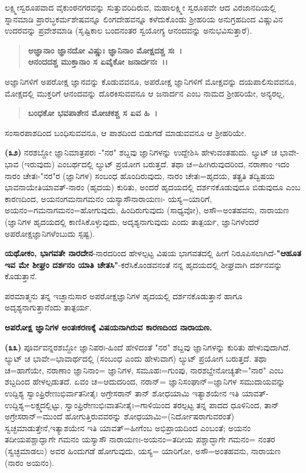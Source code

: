 
ಲಕ್ಷ್ಮೀಸ್ವರೂಪವಾದ ವೈಕುಂಠನಗರವನ್ನು ಸುತ್ತುವರಿದಿರುವ, ಮಹಾಲಕ್ಷ್ಮೀ ಸ್ವರೂಪವೇ ಆದ ವಿರಜಾನದಿಯಲ್ಲಿ ಸ್ನಾನಮಾಡಿ ಪ್ರಾರಬ್ಧಕರ್ಮಶೇಷವನ್ನೂ ಲಿಂಗದೇಹವನ್ನೂ ಕಳೆದುಕೊಂಡು ಶ‍್ರೀಹರಿಯ ಅನುಗ್ರಹದಿಂದ ವಿಷ್ಣುವಿನ ಉದರವನ್ನು ಪ್ರವೇಶಮಾಡಿ (ಸೃಷ್ಟಿಕಾಲ ಬಂದನಂತರ ಸ್ವಯೋಗ್ಯ ಆನಂದವನ್ನು ಅನುಭವಿಸುತ್ತಾರೆ).

\newpage

\begin{verse}
\textbf{ಅಜ್ಞಾನಾಂ ಜ್ಞಾನದೋ ವಿಷ್ಣುಃ ಜ್ಞಾನಿನಾಂ ಮೋಕ್ಷದಶ್ಚ ಸಃ~।}\\\textbf{ಆನಂದದಶ್ಚ ಮುಕ್ತಾನಾಂ ಸ ಏವೈಕೋ ಜನಾರ್ದನಃ~।।}
\end{verse}


ಅಜ್ಞಾನಿಗಳಿಗೆ ಅಪರೋಕ್ಷ ಜ್ಞಾನವನ್ನು ಕೊಡುವವನೂ, ಅಪರೋಕ್ಷ ಜ್ಞಾನಿಗಳಿಗೆ ಮೋಕ್ಷವನ್ನು ದಯಪಾಲಿಸುವವನೂ, ಮೋಕ್ಷದಲ್ಲಿ ಮುಕ್ತರಿಗೆ ಆನಂದವನ್ನು ದೊರಕಿಸುವವನೂ ಆ ಜನಾರ್ದನ ಎಂಬ ನಾಮದ ಶ‍್ರೀಹರಿಯೇ, ಅನ್ಯರಲ್ಲ,

\begin{verse}
\textbf{ಬಂಧಕೋ ಭವಪಾಶೇನ ಮೋಚಕಶ್ಚ ಸ ಏವ ಹಿ~।}
\end{verse}


ಸಂಸಾರಪಾಶದಿಂದ ಬಂಧಿಸುವವನೂ, ಆ ಪಾಶದಿಂದ ಬಿಡುಗಡೆ ಮಾಡುವವನೂ ಆ ಶ‍್ರೀಹರಿಯೇ.

\textbf{(೩೨)} ನರಶಬ್ದೋ ಜ್ಞಾನಿಮಾತ್ರಪರಃ -"ನರ" ಶಬ್ದವು ಜ್ಞಾನಿಗಳನ್ನು ಉದ್ದೇಶಿಸಿ ಹೇಳು\-ವಂತಹುದು. ಲ್ಯುಟ್ ಚ ಭಾವೇ-ಭಾವ (ಇರುವುದು) ಎಂಬರ್ಥದಲ್ಲಿ ಲ್ಯುಟ್ ಪ್ರಯೋಗ ಬರುತ್ತದೆ. ತಥಾ ಚ=ಹೀಗಿರುವುದರಿಂದ, ನರಾಣಾಂ ಇದಂ ನಾರಂ ಚೇತಃ-"ನರ"ರ (ಜ್ಞಾನಿಗಳ) ಸಂಬಂಧ ಹೊಂದಿರುವುದು, ನಾರಂ ಚೇತಃ=ಹೃದಯ, ತತ್ಪ್ರತಿ ತದ್ವಿಷಯ ಭಾವನಾಯೇತಿಯಾವತ್-ನಾರಂ (ಹೃದಯ) ಕುರಿತು, ಅಂದರೆ ಹೃದಯದಲ್ಲಿ ದರ್ಶನಕೊಡುವುದೂ ಬಿಡುವುದೂ ಎಂಬ ಕಾರಣದಿಂದ, ಅಯನಂಗಮನಾಗಮನಂ ಯಸ್ಯಾಸೌ\break ನಾರಾಯಣಃ- ಯಸ್ಯ=ಯಾರಿಗೆ, ಅಯನಂ=ಗಮನಾಗಮನಂ=ಹೋಗುವುದು, ಹಿಂದಿರು\-ಗುವುದು (ಸಾಧ್ಯವೋ), ಅಸೌ=ಅಂತಹವನು, ನಾರಾಯಣ (ಜ್ಞಾನಿಗಳ ಹೃದಯದಲ್ಲಿ ಕಾಣಿಸಿ\-ಕೊಳ್ಳುವುದು, ಅದೃಶ್ಯನಾಗುವುದು ಎಂದು ತಾತ್ಪರ್ಯ, ಜ್ಞಾನಿಗಳೆಂದರೆ ಅಪರೋಕ್ಷ\-ಜ್ಞಾನಿಗಳೆಂಬುದು ಸ್ಪಷ್ಟ).

\textbf{ಯಥೋಕಂ, ಭಾಗವತೇ ನಾರದೇನ}-ನಾರದರಿಂದ ಹೇಳಲ್ಪಟ್ಟ ವಿಷಯ ಭಾಗವತದಲ್ಲಿ ಹೀಗೆ ನಿರೂಪಿಸಲಾಗಿದೆ-\textbf{"ಆಹೂತ ಇವ ಮೇ ಶೀಘ್ರಂ ದರ್ಶನಂ ಯಾತಿ ಚೇತಸಿ"}\break -ಕರೆಸಿಕೊಂಡವನಂತೆ ನನ್ನ ಹೃದಯದಲ್ಲಿ ಶೀಘ್ರವಾಗಿ ದರ್ಶನವನ್ನು ಕೊಡುತ್ತಾನೆ.

ಪರಮಾತ್ಮನು ತನ್ನ ಇಚ್ಛಾನುಸಾರ ಅಪರೋಕ್ಷಜ್ಞಾನಿಗಳ ಹೃದಯಲ್ಲಿ ದರ್ಶನಕೊಡುತ್ತಾನೆ ಹಾಗೂ ಅದೃಶ್ಯನಾಗುತ್ತಾನೆಂದು ತಾತ್ಪರ್ಯ.

\begin{center}
\textbf{ಅಪರೋಕ್ಷ ಜ್ಞಾನಿಗಳ ಅಂತಃಕರಣಕ್ಕೆ ವಿಷಯನಾಗಿರುವ ಕಾರಣದಿಂದ ನಾರಾಯಣ.}
\end{center}

\textbf{(೩೩)} ಪೂರ್ವವನ್ನರಶಬ್ದೋ ಜ್ಞಾನಿಪರಃ-ಹಿಂದೆ ಹೇಳಿದಂತೆ "ನರ" ಶಬ್ದವು ಜ್ಞಾನಿಗಳನ್ನು ಕುರಿತು ಹೇಳುವುದಾಗಿದೆ. ಲ್ಯುಟ್ ಚ ಭಾವೇ=ಭಾವಾರ್ಥದಲ್ಲಿ (ಸಂಬಂಧ ಎಂದು ಹೇಳುವಾಗ) ಲ್ಯುಟ್ ಪ್ರಯೋಗ ಬರುತ್ತದೆ. ತಥಾ ಚ=ಹಾಗೆಯೇ, ನರಾಣಾಂ ಜ್ಞಾನಿನಾಂ= ಜ್ಞಾನಿಗಳ, ಸಮೂಹಃ=ಗುಂಪು, ನಾರಶಬ್ದೇನೋಚ್ಯತೇ="ನಾರ" ಎಂಬ ಶಬ್ದದಿಂದ ಹೇಳಲ್ಪಡುತದೆ. ಏವಂ ಚ=ಆದುದರಿಂದ, ನರಾನ್= ಜ್ಞಾನಿಸಂಘಾನ್=ಜ್ಞಾನಿಗಳ ಸಮುದಾಯವನ್ನು ಉದ್ದಿಶ್ಯ ಸ್ವಾಂಫ್ರಿರೇಣುಭಿರ್ವಾತನೀತೈಃ ಅಗ್ರೇಸರಾನ್ ತಾನ್ ಶೋಧ\-ಯಾಮಿ ಇತ್ಯಾಶಯೇನ ಇತಿ ಯಾವತ್‌-ಉದ್ದಿಶ್ಯ=ಲಕ್ಷ್ಮದಲ್ಲಿಟ್ಟು, ಸ್ವಾಂಫ್ರಿರೇಣುಭಿಃವಾತನೀತೈಃ=ಗಾಳಿಯಿಂದ ತರಲ್ಪಟ್ಟ ತನ್ನ ಪಾದದ ಧೂಳಿನಿಂದ, ತಾನ್ ಅಗ್ರೇಸರಾನ್=ಮುಂದೆ ಹೋಗುತ್ತಿರುವವರನ್ನು ಶೋಧಯಾಮಿ=(ನಿರ್ದೋಷರಾಗುವರಂತೆ) ಸ್ವಚ್ಛಮಾಡುತ್ತೇನೆ,\break ಇತ್ಯಾಶಯೇನ ಇತಿ ಯಾವತ್=ಹೀಗೆಂಬ ಅಭಿಪ್ರಾಯದಿಂದ ಎಂಬಂತೆ; ಅಯನಂ ತದೀಯಪಶ್ಚಾದ್ಘಾಗೇ ಗಮನಂ ಯಸ್ಯಾಸೌ ನಾರಾಯಣಃ-ಅಯನಂ=ತದೀಯ ಪಶ್ಚಾದ್ಭಾಗೇ ಗಮನಂ= ನಂತರ (ಸ್ವಚ್ಛಮಾಡಲು) ಅವರ ಹಿಂದುಗಡೆ ಹೋಗುವುದು, ಯಸ್ಯ= ಯಾರಿಗೋ, ಅಸೌ=ಅಂತಹವನು, ನಾರಾಯಣ (ನಾರಂ ಅಯನಂ).

